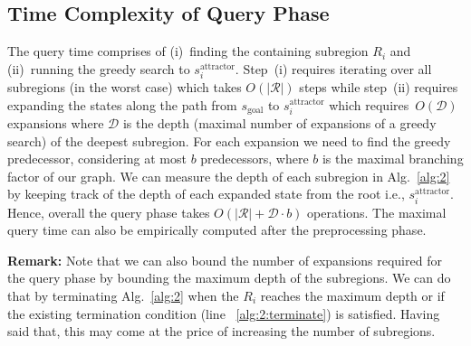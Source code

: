 \documentclass[letterpaper]{article} %
\newcommand{\calR}{\ensuremath{\mathcal{R}}\xspace}
\newcommand{\calD}{\ensuremath{\mathcal{D}}\xspace}
\newcommand{\sAttract}{\ensuremath{s^{\text{attractor}}_i}\xspace}
\newcommand{\sGoal}{\ensuremath{s_{\text{goal}}\xspace}}
\begin{document}
\subsection{Time Complexity of Query Phase}
\label{subsec:complexity}
The query time comprises of 
(i)~finding the containing subregion $R_i$ 
and
(ii)~running the greedy search to $\sAttract$.
Step~(i) requires iterating over all subregions (in the worst case) which takes $O(|\calR|)$ steps while 
step~(ii) requires expanding the states along the path from $\sGoal$ to $\sAttract$ which requires~$O(\calD)$ expansions where $\calD$ is the depth (maximal number of expansions of a greedy search) of the deepest subregion. 
For each expansion we need to find the greedy predecessor, considering at most $b$ predecessors, where $b$ is the maximal branching factor of our graph.
We can measure the depth of each subregion in Alg.~\ref{alg:2} by keeping track of the depth of each expanded state from the root i.e., $\sAttract$. Hence, overall the query phase takes $O(|\calR| + \calD \cdot b)$ operations. The maximal query time can also be empirically computed after the preprocessing phase.

%
\textbf{Remark:}
Note that we can also bound the number of expansions required for the query phase by bounding the maximum depth of the subregions. We can do that by terminating Alg.~\ref{alg:2} when the $R_i$ reaches the maximum depth or if the existing termination condition (line ~\ref{alg:2:terminate}) is satisfied.
Having said that, this may come at the price of increasing the number of subregions.
\end{document}

